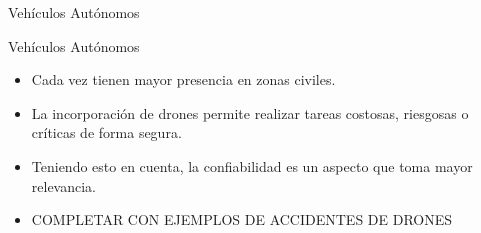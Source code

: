 \begin{frame}{Vehículos Autónomos}
{\begin{minipage}{1\textwidth}
	\end{minipage}
}
\end{frame}

\begin{frame}{Vehículos Autónomos}
	\begin{itemize}
		\item Cada vez tienen mayor presencia en zonas civiles.
		\item La incorporación de drones permite realizar tareas costosas,  riesgosas o críticas de forma segura.
		\item Teniendo esto en cuenta, la confiabilidad es un aspecto que toma mayor relevancia.
		\item {COMPLETAR CON EJEMPLOS DE ACCIDENTES DE DRONES}
	\end{itemize}
\end{frame}

